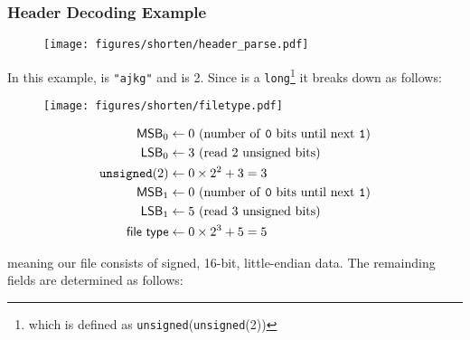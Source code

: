 \clearpage

\subsubsection{Header Decoding Example}

\begin{figure}[h]
  \texttt{[image: figures/shorten/header\_parse.pdf]}
\end{figure}
In this example,  is \texttt{"ajkg"} and
 is 2.
Since  is a \texttt{long}\footnote{which is defined as
  \texttt{unsigned}(\texttt{unsigned}(2))}
it breaks down as follows:
\par
\noindent
\begin{wrapfigure}[3]{r}{140pt}
  \texttt{[image: figures/shorten/filetype.pdf]}
\end{wrapfigure}
{
  \begin{align*}
    \textsf{MSB}_0 &\leftarrow 0
    \text{ (number of \texttt{0} bits until next \texttt{1})} \\
    \textsf{LSB}_0 &\leftarrow 3
    \text{ (read 2 unsigned bits)} \\
    \texttt{unsigned}(2) &\leftarrow 0 \times 2 ^ 2 + 3 = 3 \\
    \textsf{MSB}_1 &\leftarrow 0
    \text{ (number of \texttt{0} bits until next \texttt{1})} \\
    \textsf{LSB}_1 &\leftarrow 5
    \text{ (read 3 unsigned bits)} \\
    \textsf{file type} &\leftarrow 0 \times 2 ^ 3 + 5 = 5 \\
  \end{align*}
}
\par
\noindent
meaning our file consists of signed, 16-bit, little-endian data.
The remainding fields are determined as follows:
